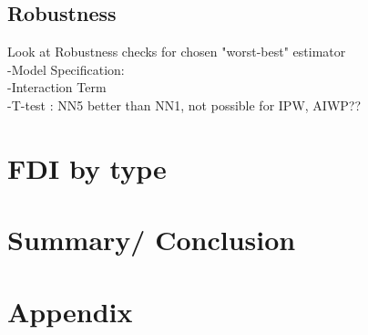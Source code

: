 \documentclass[a4paper,12pt]{scrartcl}
\newcommand{\sectionnumbering}[1]{%
  \setcounter{section}{0}%
   \renewcommand{\thesection}{\csname #1\endcsname{section}}}
\begin{document}
\subsection{Robustness}
Look at Robustness checks for chosen "worst-best" estimator \\
-Model Specification: \\
-Interaction Term\\
-T-test : NN5 better than NN1, not possible for IPW, AIWP??






\section{FDI by type}

\section{Summary/ Conclusion}




\newpage






\section*{Appendix}
\sectionnumbering{Roman}
\setcounter{page}{3} %
\end{document}
